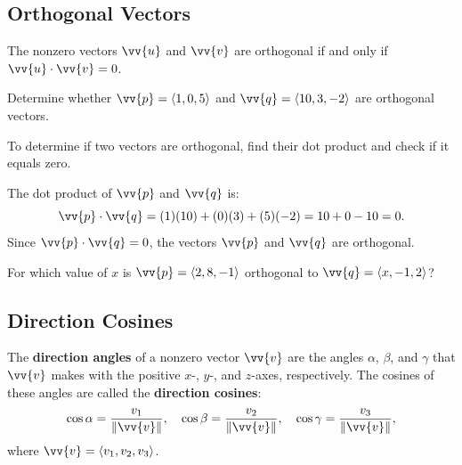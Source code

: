 \documentclass{article}
\begin{document}
\subsection*{Orthogonal Vectors}

The nonzero vectors \(\vv{u}\) and \(\vv{v}\) are orthogonal if and only if \(\vv{u} \cdot \vv{v} = 0\).

\begin{examplebox}
    Determine whether \(\vv{p} = \langle 1, 0, 5 \rangle\) and \(\vv{q} = \langle 10, 3, -2 \rangle\) are orthogonal vectors.

    \begin{solutionbox}
        \begin{conceptbox}
        To determine if two vectors are orthogonal, find their dot product and check if it equals zero.
        \end{conceptbox}

        The dot product of \(\vv{p}\) and \(\vv{q}\) is:
        \[
        \vv{p} \cdot \vv{q} = (1)(10) + (0)(3) + (5)(-2) = 10 + 0 - 10 = 0.
        \]
        Since \(\vv{p} \cdot \vv{q} = 0\), the vectors \(\vv{p}\) and \(\vv{q}\) are orthogonal.
    \end{solutionbox}
\end{examplebox}

\begin{exercisebox}
    For which value of \(x\) is \(\vv{p} = \langle 2, 8, -1 \rangle\) orthogonal to \(\vv{q} = \langle x, -1, 2 \rangle\)?
\end{exercisebox}

\subsection*{Direction Cosines}

The \textbf{direction angles} of a nonzero vector \(\vv{v}\) are the angles \(\alpha\), \(\beta\), and \(\gamma\) that \(\vv{v}\) makes with the positive \(x\)-, \(y\)-, and \(z\)-axes, respectively. The cosines of these angles are called the \textbf{direction cosines}:
\[
\cos \alpha = \frac{v_1}{\|\vv{v}\|}, \quad \cos \beta = \frac{v_2}{\|\vv{v}\|}, \quad \cos \gamma = \frac{v_3}{\|\vv{v}\|},
\]
where \(\vv{v} = \langle v_1, v_2, v_3 \rangle\).
\end{document}
